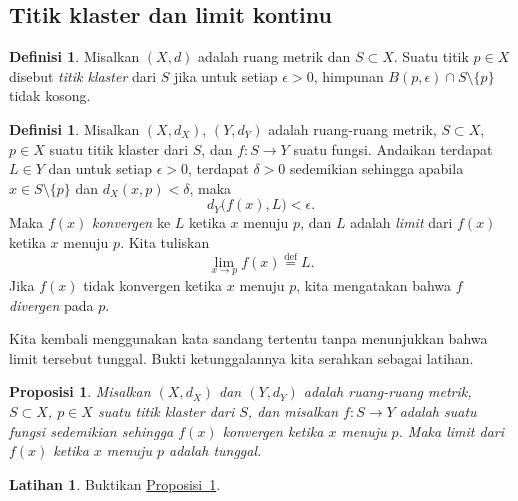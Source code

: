 \documentclass[12pt,openany]{book}
\theoremstyle{plain}
\newtheorem{prop}[thm]{Proposisi}
\theoremstyle{remark}
\theoremstyle{definition}
\newtheorem{defn}[thm]{Definisi}
\newenvironment{exbox}{%
    \def\FrameCommand{\vrule width 1pt \relax\hspace{10pt}}%
    \MakeFramed{\advance\hsize-\width\FrameRestore}%
}{%
    \endMakeFramed
}
\theoremstyle{exercise}
\newtheorem{exercise}{Latihan}[section]
\theoremstyle{example}
\newcommand{\propref}[1]{\hyperref[#1]{Proposisi~\ref*{#1}}}
\begin{document}
\subsection{Titik klaster dan limit kontinu}

\begin{defn}
Misalkan $(X,d)$ adalah ruang metrik dan
$S \subset X$. Suatu titik $p \in X$ disebut
\emph{titik klaster} dari $S$
jika untuk setiap $\epsilon > 0$, himpunan $B(p,\epsilon) \cap S
\setminus \{ p \}$ tidak kosong.
\end{defn}

\begin{defn}
%
Misalkan $(X,d_X)$, $(Y,d_Y)$ adalah ruang-ruang metrik, $S \subset X$, $p \in X$ suatu titik klaster dari $S$,
dan $f \colon S \to Y$ suatu fungsi.
Andaikan terdapat $L \in Y$ dan untuk setiap $\epsilon > 0$,
terdapat $\delta > 0$ sedemikian sehingga apabila $x \in S \setminus \{ p \}$
dan $d_X(x,p) < \delta$, maka
\begin{equation*}
d_Y\bigl(f(x),L\bigr) < \epsilon .
\end{equation*}
Maka $f(x)$
\emph{konvergen} ke $L$ ketika $x$
menuju $p$, dan $L$ adalah \emph{limit} dari $f(x)$ ketika $x$
menuju $p$.  Kita tuliskan
%
\begin{equation*}
\lim_{x \to p} f(x) \overset{\text{def}}{=} L .
\end{equation*}
Jika $f(x)$ tidak konvergen ketika $x$ menuju $p$, kita mengatakan bahwa $f$
\emph{divergen} pada $p$.
\end{defn}

Kita kembali menggunakan kata sandang tertentu tanpa menunjukkan bahwa
limit tersebut tunggal.  Bukti ketunggalannya kita serahkan sebagai latihan.

\begin{prop} \label{prop:mslimitisunique}
Misalkan $(X,d_X)$ dan $(Y,d_Y)$ adalah ruang-ruang metrik, $S \subset X$, $p \in X$
suatu titik klaster dari $S$, dan misalkan $f \colon S \to Y$ adalah suatu fungsi
sedemikian sehingga $f(x)$ konvergen ketika $x$ menuju $p$.  Maka
limit dari $f(x)$ ketika $x$ menuju $p$ adalah tunggal.
\end{prop}

\begin{exbox}
\begin{exercise}
Buktikan \propref{prop:mslimitisunique}.
\end{exercise}
\end{exbox}
\end{document}
